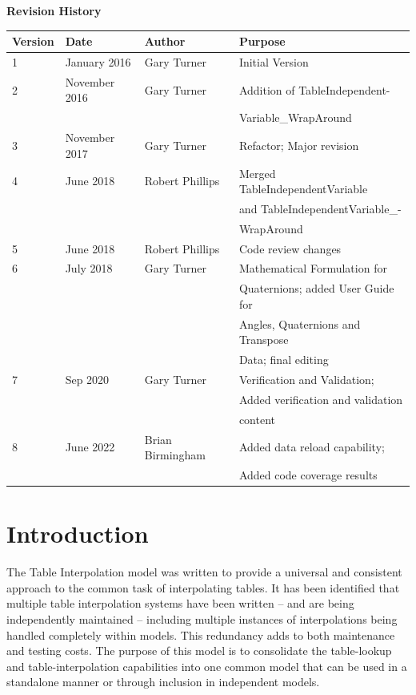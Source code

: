 \documentclass[11pt,fleqn]{report}
\begin{document}
\pagestyle{empty}
\titlePage
\clearpage
\pagestyle{plain}
\tableofcontents %
\vfill
{\Large \textbf {Revision History}}
{\large
\begin{center}
\begin{tabular}{|l||l|l|l|}
\hline
 \textbf{Version} & \textbf{Date} & \textbf{Author} & \textbf{Purpose} \\
 \hline \hline
1 & January 2016 & Gary Turner & Initial Version \\ \hline
2 & November 2016 & Gary Turner & Addition of TableIndependent- \\
   & & & Variable\_WrapAround \\ \hline
3 & November 2017 & Gary Turner & Refactor; Major revision \\ \hline
4 & June 2018 & Robert Phillips & Merged TableIndependentVariable \\
   & & & and TableIndependentVariable\_- \\
   & & & WrapAround \\ \hline
5 & June 2018 & Robert Phillips & Code review changes \\ \hline
6 & July 2018 & Gary Turner  & Mathematical Formulation for \\
   & & & Quaternions; added User Guide for \\
   & & & Angles, Quaternions and Transpose\\
   & & & Data; final editing \\ \hline
7 & Sep 2020 & Gary Turner     & Verification and Validation; \\
   & & & Added verification and validation \\
   & & & content \\ \hline
8 & June 2022 & Brian Birmingham & Added data reload capability;  \\
   & & & Added code coverage results \\ \hline
\end{tabular}
\end{center}
}

\chapter{Introduction} %
The Table Interpolation model was written to provide a universal and consistent
approach to the common task of interpolating tables.
It has been identified that multiple table interpolation systems have been
written -- and are being independently maintained -- including
multiple instances of interpolations being handled completely within models.
This redundancy adds to both maintenance and testing costs.
The purpose of this model is to consolidate the table-lookup and
table-interpolation capabilities into one common model that can be used in
a standalone manner or through inclusion in independent models.
\end{document}
